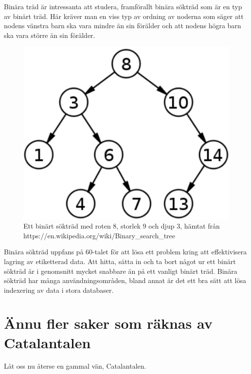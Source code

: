 \documentclass[nobib]{tufte-handout}
\begin{document}
\begin{example}
    Binära träd är intressanta att studera, framförallt binära sökträd som är en typ av binärt träd. Här kräver man en viss typ av ordning av noderna som säger att nodens vänstra barn ska vara mindre än sin förälder och att nodens högra barn ska vara större än sin förälder. 

    \begin{figure}
        \centering
        \includegraphics{graphics/F8/Bts.jpeg}
        \caption{Ett binärt sökträd med roten 8, storlek 9 och djup 3, hämtat från https://en.wikipedia.org/wiki/Binary\_search\_tree}
        \label{fig:Bts}
    \end{figure}

Binära sökträd uppfans på 60-talet för att lösa ett problem kring att effektivisera lagring av etiketterad data. Att hitta, sätta in och ta bort något ur ett binärt sökträd är i genomsnitt mycket snabbare än på ett vanligt binärt träd. Binära sökträd har många användningsområden, bland annat är det ett bra sätt att lösa indexering av data i stora databaser.

\end{example}

\section{Ännu fler saker som räknas av Catalantalen}

Låt oss nu återse en gammal vän, Catalantalen.
\end{document}
